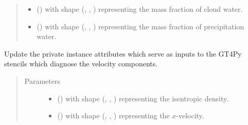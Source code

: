 \documentclass[letterpaper,10pt,english]{sphinxmanual}
\begin{document}
\begin{fulllineitems}
\begin{fulllineitems}
\begin{quote}
\begin{description}
\begin{itemize}
\item {} 
 () \textendash{}  with shape (, , ) representing the mass fraction of
cloud water.

\item {} 
 () \textendash{}  with shape (, , ) representing the mass fraction of
precipitation water.

\end{itemize}

\end{description}\end{quote}

\end{fulllineitems}


\begin{fulllineitems}
\label{\detokenize{api:tasmania.dycore.diagnostic_isentropic.DiagnosticIsentropic._stencils_diagnosing_velocity_set_inputs}}
Update the private instance attributes which serve as inputs to the GT4Py stencils which diagnose
the velocity components.
\begin{quote}\begin{description}
\item[{Parameters}] \leavevmode\begin{itemize}
\item {} 
 () \textendash{}  with shape (, , ) representing the isentropic density.

\item {} 
 () \textendash{}  with shape (, , ) representing the \(x\)-velocity.


\end{itemize}
\end{description}
\end{quote}
\end{fulllineitems}
\end{fulllineitems}
\end{document}
